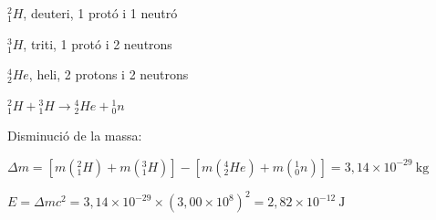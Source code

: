 \begin{solapartat}
 ${}^{2}_{1}H$, deuteri, 1 protó i 1 neutró

\smallskip
{} ${}^{3}_{1}H$, triti, 1 protó i 2 neutrons

\smallskip
{} ${}^{4}_{2}He$, heli, 2 protons i 2 neutrons

\smallskip
{} ${}^{2}_{1}H + {}^{3}_{1}H \rightarrow {}^{4}_{2}He + {}^{1}_{0}n$
\end{solapartat}

\begin{solapartat}
Disminució de la massa:

\smallskip
{} $\Delta m = \left[m({}^{2}_{1}H) + m({}^{3}_{1}H)\right] - \left[m({}^{4}_{2}He) + m({}^{1}_{0}n)\right] = 3,14\times 10^{-29}\ \mathrm{kg}$

\smallskip
{} $E = \Delta mc^2 = 3,14\times 10^{-29}\times (3,00\times 10^{8})^2 = 2,82\times 10^{-12}\ \mathrm{J}$
\end{solapartat}
